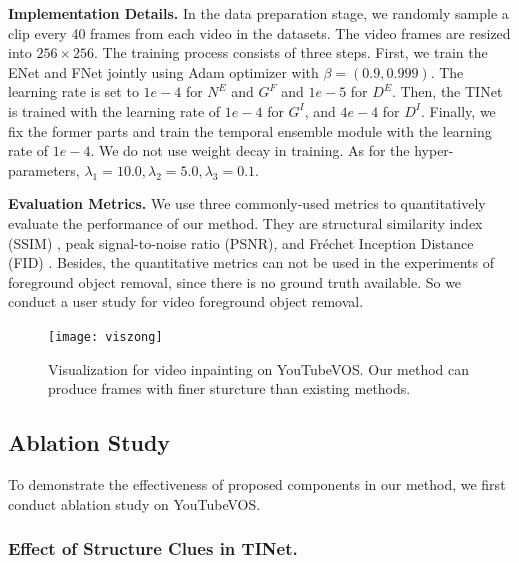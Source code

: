 \noindent \textbf{Implementation Details.} 
In the data preparation stage, we randomly sample a clip every 40 frames from each video in the datasets.
The video frames are resized into $256\times256$.
%
The training process consists of three steps.
First, we  train the ENet and FNet jointly using Adam optimizer with $\beta=(0.9, 0.999)$.
The learning rate is set to $1e-4$ for $N^E$ and $G^F$ and $1e-5$ for $D^E$. Then, the TINet is trained with the learning rate of $1e-4$ for $G^I$, and $4e-4$ for $D^I$. Finally, we fix the former parts and train the temporal ensemble module with the learning rate of $1e-4$. We do not use weight decay in training.
As for the hyper-parameters, $\lambda_1=10.0,\lambda_2=5.0, \lambda_3=0.1$.

\noindent \textbf{Evaluation Metrics.} 
We use three commonly-used metrics to quantitatively evaluate the performance of our method. They are structural similarity index (SSIM) \cite{wang2004image}, peak signal-to-noise ratio (PSNR), and Fr{\'e}chet Inception Distance (FID) \cite{heusel2017gans}. 
Besides, the quantitative metrics can not be used in the experiments of foreground object removal, since there is no ground truth available. So we conduct a user study for video foreground object removal. 
%



\begin{figure}[t]
	\centering
	\texttt{[image: viszong]} %
	\caption{Visualization for video inpainting on YouTubeVOS. Our method can produce frames with finer sturcture than existing methods. }
	\label{viszong}
\end{figure}




\subsection{Ablation Study}
To demonstrate the effectiveness of proposed components in our method, we first conduct ablation study on YouTubeVOS. 

\subsubsection{Effect of Structure Clues in TINet.}



